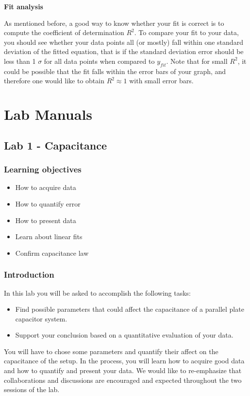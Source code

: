 \documentclass[12pt]{report}
\begin{document}
\noindent \large \textbf{Fit analysis} \normalsize

As mentioned before, a good way to know whether your fit is correct is to compute the coefficient of determination $R^2$. To compare your fit to your data, you should see whether your data points all (or mostly) fall within one standard deviation of the fitted equation, that is if the standard deviation error should be less than 1 $\sigma$ for all data points when compared to $y_{fit}$.
Note that for small $R^2$, it could be possible that the fit falls within the error bars of your graph, and therefore
one would like to obtain $R^2\approx 1$ with small error bars.


\part{Lab Manuals} \label{Part:Labs}

\chapter{Lab 1 - Capacitance}
\section{Learning objectives}
\begin{itemize}
\item How to acquire data
\item How to quantify error
\item How to present data
\item Learn about linear fits
\item Confirm capacitance law
\end{itemize}


\section{Introduction}
In this lab you will be asked to accomplish the following tasks:
\begin{itemize}
\item Find possible parameters that could affect the capacitance of a parallel plate capacitor system.
\item Support your conclusion based on a quantitative evaluation of your data.
\end{itemize}

You will have to chose some parameters and quantify their affect on the capacitance of the setup. In the process, you will learn how to acquire good data and how to quantify and present your data. We would like to re-emphasize that collaborations and discussions are encouraged and expected throughout the two sessions of the lab.
\end{document}
